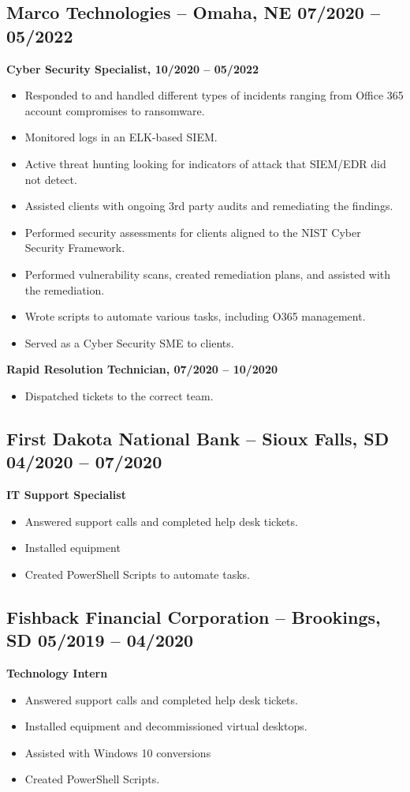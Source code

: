 \documentclass[a4paper,10pt]{article}
\begin{document}
\subsection*{Marco Technologies – Omaha, NE \hfill 07/2020 – 05/2022}
\textbf{Cyber Security Specialist, 10/2020 – 05/2022}
\begin{itemize}
    \item Responded to and handled different types of incidents ranging from Office 365 account compromises to ransomware.
    \item Monitored logs in an ELK-based SIEM.
    \item Active threat hunting looking for indicators of attack that SIEM/EDR did not detect.
    \item Assisted clients with ongoing 3rd party audits and remediating the findings.
    \item Performed security assessments for clients aligned to the NIST Cyber Security Framework.
    \item Performed vulnerability scans, created remediation plans, and assisted with the remediation.
    \item Wrote scripts to automate various tasks, including O365 management.
    \item Served as a Cyber Security SME to clients.
\end{itemize}
\textbf{Rapid Resolution Technician, 07/2020 – 10/2020}
\begin{itemize}
    \item Dispatched tickets to the correct team.
\end{itemize}

\subsection*{First Dakota National Bank – Sioux Falls, SD \hfill 04/2020 – 07/2020}
\textbf{IT Support Specialist}
\begin{itemize}
    \item Answered support calls and completed help desk tickets.
    \item Installed equipment
    \item Created PowerShell Scripts to automate tasks.
\end{itemize}
\subsection*{Fishback Financial Corporation – Brookings, SD \hfill 05/2019 – 04/2020}
\textbf{Technology Intern}
\begin{itemize}
    \item Answered support calls and completed help desk tickets.
    \item Installed equipment and decommissioned virtual desktops.
    \item Assisted with Windows 10 conversions
    \item Created PowerShell Scripts.
\end{itemize}
\end{document}

